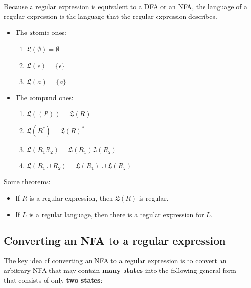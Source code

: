\documentclass[12pt, letterpaper, oneside]{book}
\begin{document}
Because a regular expression is equivalent to a DFA or an NFA, the language of a regular expression is the language
that the regular expression describes.

\begin{itemize}
  \item The atomic ones:
        \begin{enumerate}
          \item $\mathfrak{L}(\emptyset) = \emptyset$
          \item $\mathfrak{L}(\epsilon) = \{ \epsilon \}$
          \item $\mathfrak{L}(a) = \{ a \}$
        \end{enumerate}
  \item The compund ones:
        \begin{enumerate}
          \item $\mathfrak{L}((R)) = \mathfrak{L}(R)$
          \item $\mathfrak{L}(R^*) = \mathfrak{L}(R)^*$
          \item $\mathfrak{L}(R_1R_2) = \mathfrak{L}(R_1)\mathfrak{L}(R_2)$
          \item $\mathfrak{L}(R_1 \cup R_2) = \mathfrak{L}(R_1) \cup \mathfrak{L}(R_2)$
        \end{enumerate}
\end{itemize}

Some theorems:
\begin{itemize}
  \item If $R$ is a regular expression, then $\mathfrak{L}(R)$ is regular.
  \item If $L$ is a regular language, then there is a regular expression for $L$.
\end{itemize}

\subsection{Converting an NFA to a regular expression}

The key idea of converting an NFA to a regular expression is to convert an arbitrary NFA that may contain \textbf{many
  states} into the following general form that consists of only \textbf{two states}:

\end{document}
